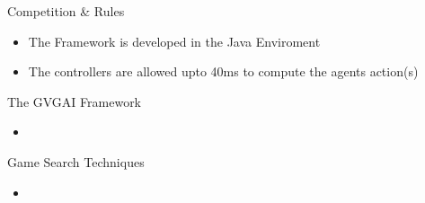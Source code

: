 \documentclass{beamer}
\begin{document}
\begin{frame}{Competition \& Rules}		
			\begin{itemize}
			\item The Framework is developed in the Java Enviroment \pause
			\item The controllers are allowed upto 40ms to compute the agents action(s)  \pause

		\end{itemize}
\end{frame}


\begin{frame}{The GVGAI Framework}		
			\begin{itemize}
			\item 

		\end{itemize}
\end{frame}

\begin{frame}{Game Search Techniques}		
			\begin{itemize}
			\item 

		\end{itemize}
\end{frame}
\end{document}
